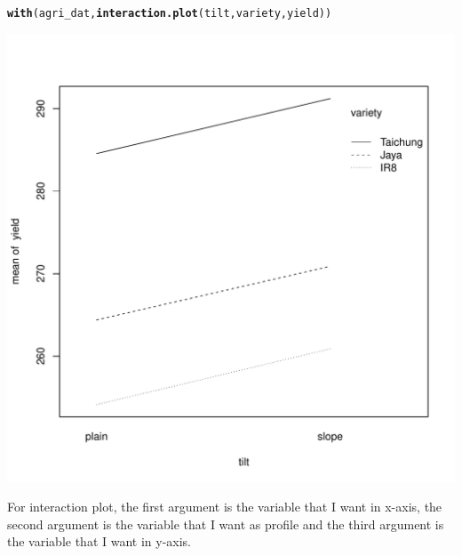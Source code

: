 \documentclass[11pt, a4paper]{article}\usepackage[]{graphicx}\usepackage[dvipsnames]{xcolor}
\makeatletter
\def\maxwidth{ %
  \ifdim\Gin@nat@width>\linewidth
    \linewidth
  \else
    \Gin@nat@width
  \fi
}
\newcommand{\hlstd}[1]{\textcolor[rgb]{0.345,0.345,0.345}{#1}}%
\newcommand{\hlkwd}[1]{\textcolor[rgb]{0.737,0.353,0.396}{\textbf{#1}}}%
\newenvironment{kframe}{%
 \def\at@end@of@kframe{}%
 \ifinner\ifhmode%
  \def\at@end@of@kframe{\end{minipage}}%
  \begin{minipage}{\columnwidth}%
 \fi\fi%
 \def\FrameCommand##1{\hskip\@totalleftmargin \hskip-\fboxsep
 \colorbox{shadecolor}{##1}\hskip-\fboxsep
     \hskip-\linewidth \hskip-\@totalleftmargin \hskip\columnwidth}%
 \MakeFramed {\advance\hsize-\width
   \@totalleftmargin\z@ \linewidth\hsize
   \@setminipage}}%
 {\par\unskip\endMakeFramed%
 \at@end@of@kframe}
\newenvironment{knitrout}{}{} %
\makeatother
\begin{document}
\begin{knitrout}
\color{fgcolor}\begin{kframe}
\begin{alltt}
\hlkwd{with}\hlstd{(agri_dat,} \hlkwd{interaction.plot}\hlstd{(tilt, variety, yield))}
\end{alltt}
\end{kframe}
\includegraphics[width=\maxwidth]{figure/unnamed-chunk-6-1} 
\end{knitrout}

For interaction plot, the first argument is the variable that I want in x-axis, the second argument is the variable that I want as profile and the third argument is the variable that I want in y-axis.\\

\newpage
\end{document}
